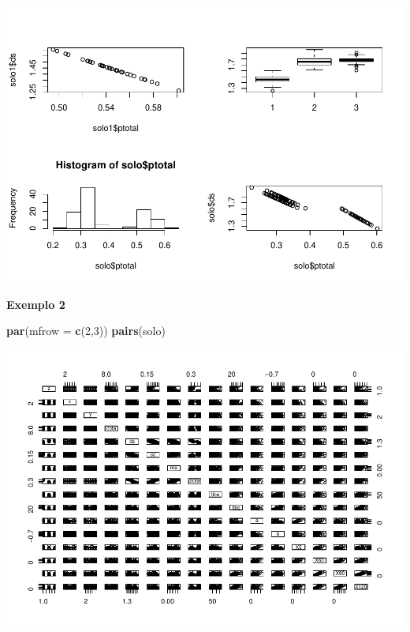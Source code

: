 \documentclass[
]{book}
\newenvironment{Shaded}{\begin{snugshade}}{\end{snugshade}}
\newcommand{\DataTypeTok}[1]{\textcolor[rgb]{0.13,0.29,0.53}{#1}}
\newcommand{\DecValTok}[1]{\textcolor[rgb]{0.00,0.00,0.81}{#1}}
\newcommand{\KeywordTok}[1]{\textcolor[rgb]{0.13,0.29,0.53}{\textbf{#1}}}
\newcommand{\NormalTok}[1]{#1}
\newcommand{\OperatorTok}[1]{\textcolor[rgb]{0.81,0.36,0.00}{\textbf{#1}}}
\begin{document}
\includegraphics{TudodoR_files/figure-latex/unnamed-chunk-180-1.pdf}

\textbf{Exemplo 2}

\begin{Shaded}
\begin{Highlighting}[]
\KeywordTok{par}\NormalTok{(}\DataTypeTok{mfrow =} \KeywordTok{c}\NormalTok{(}\DecValTok{2}\NormalTok{,}\DecValTok{3}\NormalTok{))}
\KeywordTok{pairs}\NormalTok{(solo)}
\end{Highlighting}
\end{Shaded}

\includegraphics{TudodoR_files/figure-latex/unnamed-chunk-181-1.pdf}

\begin{Shaded}
\end{Shaded}
\end{document}
